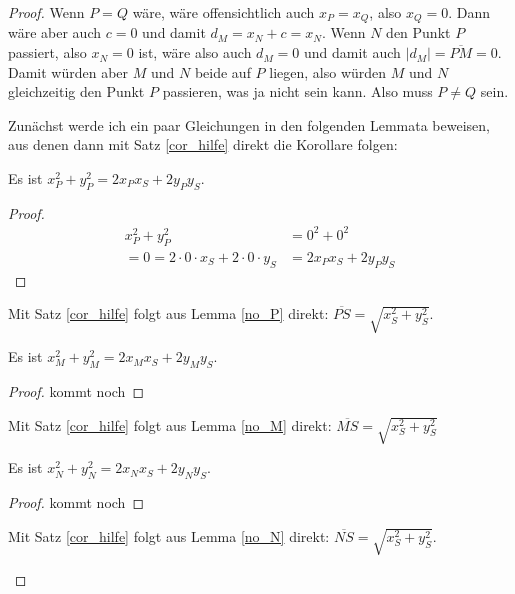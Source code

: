 \begin{proof}
    \renewcommand{\qedsymbol}{$\square$}
    Wenn $P=Q$ wäre, wäre offensichtlich auch $x_P=x_Q$, also $x_Q=0$. Dann wäre aber auch $c=0$ und damit $d_M
    =x_N+c=x_N$. Wenn $N$ den Punkt $P$ passiert, also $x_N=0$ ist, wäre also auch $d_M=0$ und damit auch $|d_M|
    =\overline{PM}=0$. Damit  würden aber $M$ und $N$ beide auf $P$ liegen, also würden $M$ und $N$ gleichzeitig 
    den Punkt $P$ passieren, was ja nicht sein kann. Also muss $P\neq Q$ sein.
    
    Zunächst werde ich ein paar Gleichungen in den folgenden Lemmata beweisen, aus denen dann mit Satz \ref{cor_hilfe}
    direkt die Korollare folgen:
    \begin{lem}\label{no_P}
        Es ist $x_P^2+y_P^2=2x_Px_S+2y_Py_S$.
    \end{lem}
    \begin{proof}
        \begin{align*}
            x_P^2+y_P^2&=0^2+0^2\\
            =0=2\cdot 0\cdot x_S+2\cdot 0\cdot y_S&=2x_Px_S+2y_Py_S
        \end{align*}
    \end{proof}
    \begin{cor}\label{noc_P}
        Mit Satz \ref{cor_hilfe} folgt aus Lemma \ref{no_P} direkt: $\overline{PS}=\sqrt{x_S^2+y_S^2}$.
    \end{cor}
    \begin{lem}\label{no_M}
        Es ist $x_M^2+y_M^2=2x_Mx_S+2y_My_S$.
    \end{lem}
    \begin{proof}
        kommt noch
    \end{proof}
    \begin{cor}\label{noc_M}
        Mit Satz \ref{cor_hilfe} folgt aus Lemma \ref{no_M} direkt: $\overline{MS}=\sqrt{x_S^2+y_S^2}$
    \end{cor}
    \begin{lem}\label{no_N}
        Es ist $x_N^2+y_N^2=2x_Nx_S+2y_Ny_S$.
    \end{lem}
    \begin{proof}
        kommt noch
    \end{proof}
    \begin{cor}\label{noc_N}
        Mit Satz \ref{cor_hilfe} folgt aus Lemma \ref{no_N} direkt: $\overline{NS}=\sqrt{x_S^2+y_S^2}$.
    \end{cor}
    \begin{lem}\label{no_Q}

\end{lem}
\end{proof}
